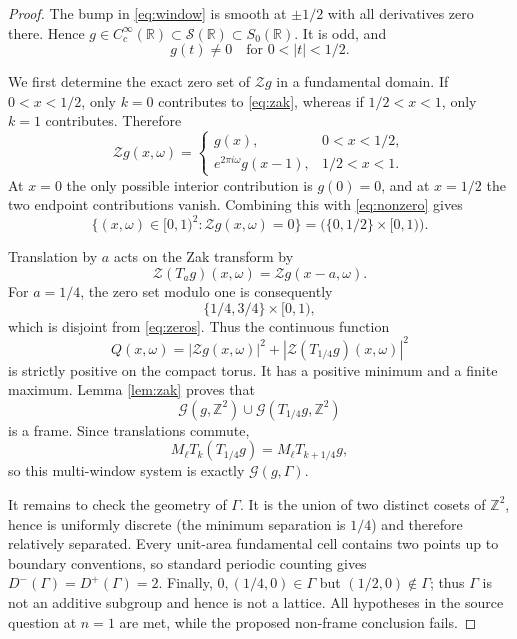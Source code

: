 \documentclass[11pt]{article}
\newcommand{\R}{\mathbb R}
\newcommand{\Z}{\mathbb Z}
\newcommand{\cG}{\mathcal G}
\newcommand{\cZ}{\mathcal Z}
\newcommand{\T}{T}
\newcommand{\M}{M}
\newcommand{\Dminus}{D^-}
\newcommand{\Dplus}{D^+}
\begin{document}
\begin{proof}
The bump in \eqref{eq:window} is smooth at $\pm1/2$ with all derivatives
zero there.  Hence $g\in C_c^\infty(\R)\subset\mathcal S(\R)\subset
S_0(\R)$.  It is odd, and
\begin{equation}\label{eq:nonzero}
 g(t)\neq0\quad\text{for }0<|t|<1/2.
\end{equation}

We first determine the exact zero set of $\cZ g$ in a fundamental domain.
If $0<x<1/2$, only $k=0$ contributes to \eqref{eq:zak}, whereas if
$1/2<x<1$, only $k=1$ contributes.  Therefore
\begin{equation}\label{eq:piecewise}
 \cZ g(x,\omega)=
 \begin{cases}
 g(x),&0<x<1/2,\\
 e^{2\pi i\omega}g(x-1),&1/2<x<1.
 \end{cases}
\end{equation}
At $x=0$ the only possible interior contribution is $g(0)=0$, and at
$x=1/2$ the two endpoint contributions vanish.  Combining this with
\eqref{eq:nonzero} gives
\begin{equation}\label{eq:zeros}
 \{(x,\omega)\in[0,1)^2:\cZ g(x,\omega)=0\}
 =\bigl(\{0,1/2\}\times[0,1)\bigr).
\end{equation}

Translation by $a$ acts on the Zak transform by
\[
 \cZ(\T_a g)(x,\omega)=\cZ g(x-a,\omega).
\]
For $a=1/4$, the zero set modulo one is consequently
\[
 \{1/4,3/4\}\times[0,1),
\]
which is disjoint from \eqref{eq:zeros}.  Thus the continuous function
\[
 Q(x,\omega)=|\cZ g(x,\omega)|^2+
 |\cZ(\T_{1/4}g)(x,\omega)|^2
\]
is strictly positive on the compact torus.  It has a positive minimum and a
finite maximum.  Lemma \ref{lem:zak} proves that
\[
 \cG(g,\Z^2)\cup\cG(\T_{1/4}g,\Z^2)
\]
is a frame.  Since translations commute,
\[
 \M_\ell\T_k(\T_{1/4}g)=\M_\ell\T_{k+1/4}g,
\]
so this multi-window system is exactly $\cG(g,\Gamma)$.

It remains to check the geometry of $\Gamma$.  It is the union of two
distinct cosets of $\Z^2$, hence is uniformly discrete (the minimum
separation is $1/4$) and therefore relatively separated.  Every unit-area
fundamental cell contains two points up to boundary conventions, so standard
periodic counting gives
$\Dminus(\Gamma)=\Dplus(\Gamma)=2$.  Finally, $0,(1/4,0)\in\Gamma$ but
$(1/2,0)\notin\Gamma$; thus $\Gamma$ is not an additive subgroup and hence
is not a lattice.  All hypotheses in the source question at $n=1$ are met,
while the proposed non-frame conclusion fails.
\end{proof}
\end{document}
